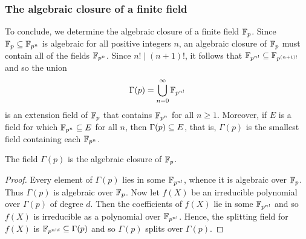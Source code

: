 \subsubsection{The algebraic closure of a finite field}
To conclude, we determine the algebraic closure of a finite field $\mathbb{F}_{p}$. Since $\mathbb{F}_{p}\subseteq\mathbb{F}_{p^n}$ is algebraic for all positive integers $n$, an algebraic closure of $\mathbb{F}_p$ must contain all of the fields $\mathbb{F}_{p^n}$. Since $n!\mid(n+1)!$, it follows that $\mathbb{F}_{p^{n!}}\subseteq\mathbb{F}_{p^{(n+1)!}}$ and so the union
\[\Gamma(p)=\bigcup_{n=0}^{\infty}\mathbb{F}_{p^{n!}}\]
is an extension field of $\mathbb{F}_p$ that contains $\mathbb{F}_{p^n}$ for all $n\geq 1$. Moreover, if $E$ is a field for which $\mathbb{F}_{p^n}\subseteq E$ for all $n$, then $\Gamma(p)\subseteq E$, that is, $\Gamma(p)$ is the smallest field containing each $\mathbb{F}_{p^n}$.
\begin{theorem}
The field $\Gamma(p)$ is the algebraic closure of $\mathbb{F}_p$.
\end{theorem}
\begin{proof}
Every element of $\Gamma(p)$ lies in some $\mathbb{F}_{p^{n!}}$, whence it is algebraic over $\mathbb{F}_p$. Thus $\Gamma(p)$ is algebraic over $\mathbb{F}_p$. Now let $f(X)$ be an irreducible polynomial over $\Gamma(p)$ of degree $d$. Then the coefficients of $f(X)$ lie in some $\mathbb{F}_{p^{n!}}$ and so $f(X)$ is irreducible as a polynomial over $\mathbb{F}_{p^{n!}}$. Hence, the splitting field for $f(X)$ is $\mathbb{F}_{p^{n!d}}\subseteq\Gamma(p)$ and so $\Gamma(p)$ splits over $\Gamma(p)$.
\end{proof}
